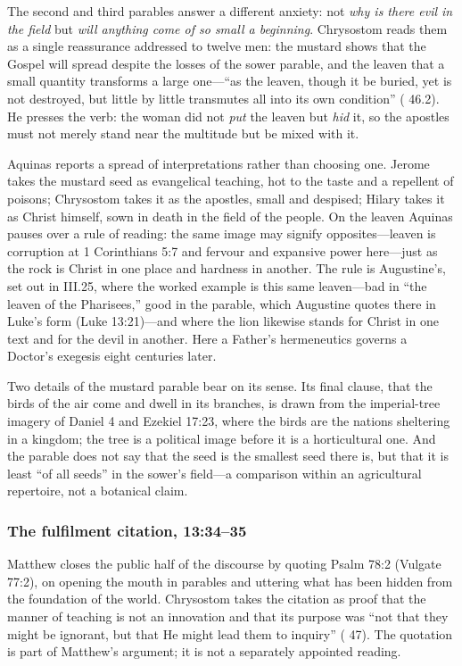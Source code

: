 The second and third parables answer a different anxiety: not \emph{why is
there evil in the field} but \emph{will anything come of so small a beginning}.
Chrysostom reads them as a single reassurance addressed to twelve men: the
mustard shows that the Gospel will spread despite the losses of the sower
parable, and the leaven that a small quantity transforms a large one---``as the
leaven, though it be buried, yet is not destroyed, but little by little
transmutes all into its own condition'' ( 46.2). He presses the
verb: the woman did not \emph{put} the leaven but \emph{hid} it, so the
apostles must not merely stand near the multitude but be mixed with it.

Aquinas reports a spread of interpretations rather than choosing one. Jerome
takes the mustard seed as evangelical teaching, hot to the taste and a
repellent of poisons; Chrysostom takes it as the apostles, small and despised;
Hilary takes it as Christ himself, sown in death in the field of the people.
On the leaven Aquinas pauses over a rule of reading: the same image may signify
opposites---leaven is corruption at 1 Corinthians 5:7 and fervour and expansive
power here---just as the rock is Christ in one place and hardness in another.
The rule is Augustine's, set out in  III.25, where
the worked example is this same leaven---bad in ``the leaven of the
Pharisees,'' good in the parable, which Augustine quotes there in Luke's form
(Luke 13:21)---and where the lion likewise stands for Christ in one text and
for the devil in another. Here a Father's hermeneutics governs a Doctor's
exegesis eight centuries later.

Two details of the mustard parable bear on its sense. Its final clause, that the
birds of the air come and dwell in its branches, is drawn from the imperial-tree
imagery of Daniel 4 and Ezekiel 17:23, where the birds are the nations
sheltering in a kingdom; the tree is a political image before it is a
horticultural one. And the parable does not say that the seed is the smallest
seed there is, but that it is least ``of all seeds'' in the sower's field---a
comparison within an agricultural repertoire, not a botanical claim.

\subsubsection*{The fulfilment citation, 13:34--35}

Matthew closes the public half of the discourse by quoting Psalm 78:2 (Vulgate
77:2), on opening the mouth in parables and uttering what has been hidden from
the foundation of the world. Chrysostom takes the citation as proof that the
manner of teaching is not an innovation and that its purpose was ``not that
they might be ignorant, but that He might lead them to inquiry''
( 47). The quotation is part of Matthew's argument; it is not a
separately appointed reading.

